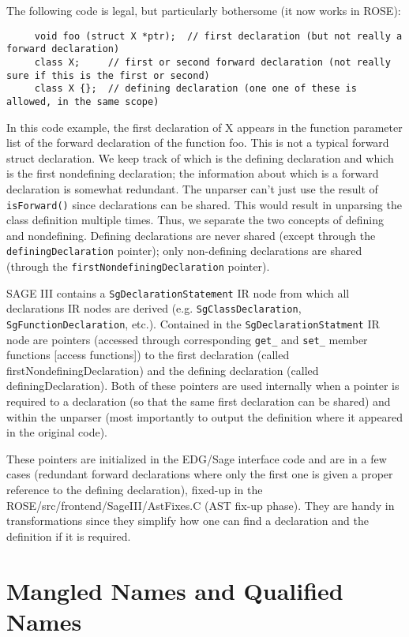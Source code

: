 The following code is legal, but particularly bothersome (it now works in ROSE):
{\indent
{\mySmallFontSize
\begin{verbatim}
     void foo (struct X *ptr);  // first declaration (but not really a forward declaration)
     class X;     // first or second forward declaration (not really sure if this is the first or second)
     class X {};  // defining declaration (one one of these is allowed, in the same scope)
\end{verbatim}
}}
   In this code example, the first declaration of X appears in the function parameter
list of the forward declaration of the function foo. This is not a typical forward 
struct declaration.  We keep track of which is the 
defining declaration and which is the first nondefining declaration; the information
about which is a forward declaration is somewhat redundant.  The unparser can't just 
use the result of {\tt isForward()} since declarations can be shared. This would
result in unparsing the class definition multiple times.  Thus, we separate
the two concepts of defining and nondefining. Defining declarations are never shared
(except through the {\tt definingDeclaration} pointer); only non-defining declarations
are shared (through the {\tt firstNondefiningDeclaration} pointer).

    SAGE III contains a {\tt SgDeclarationStatement} IR node from which all declarations IR nodes
are derived (e.g. {\tt SgClassDeclaration}, {\tt SgFunctionDeclaration}, etc.).  Contained in the
{\tt SgDeclarationStatment} IR node are pointers (accessed through corresponding {\tt get\_} and
{\tt set\_} member functions [access functions]) to the first declaration (called
firstNondefiningDeclaration) and the defining declaration (called
definingDeclaration).  Both of these pointers are used internally when a pointer is
required to a declaration (so that the same first declaration can be shared)
and within the unparser (most importantly to output the definition where it
appeared in the original code).

   These pointers are initialized in the EDG/Sage interface code and are in a few cases
(redundant forward declarations where only the first one is given a proper reference to
the defining declaration), fixed-up in the ROSE/src/frontend/SageIII/AstFixes.C (AST fix-up
phase). They are handy in transformations since they simplify how one can find a
declaration and the definition if it is required.

\section{Mangled Names and Qualified Names}

